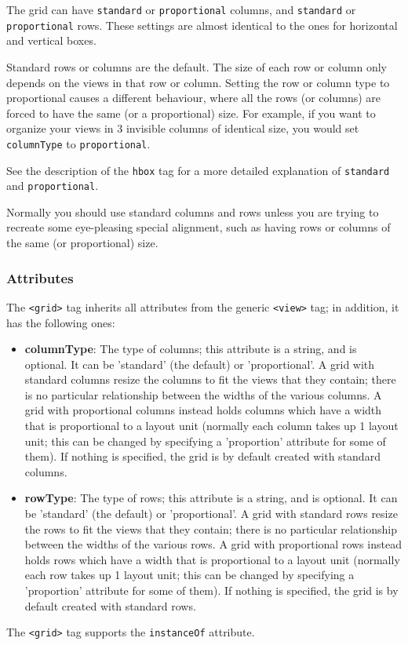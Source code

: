 The grid can have \texttt{standard} or \texttt{proportional} columns,
and \texttt{standard} or \texttt{proportional} rows.  These settings
are almost identical to the ones for horizontal and vertical boxes.

Standard rows or columns are the default.  The size of each row or
column only depends on the views in that row or column.  Setting the
row or column type to proportional causes a different behaviour, where
all the rows (or columns) are forced to have the same (or a
proportional) size.  For example, if you want to organize your views
in 3 invisible columns of identical size, you would set
\texttt{columnType} to \texttt{proportional}.

See the description of the \texttt{hbox} tag for a more detailed
explanation of \texttt{standard} and \texttt{proportional}.

Normally you should use standard columns and rows unless you are
trying to recreate some eye-pleasing special alignment, such as having
rows or columns of the same (or proportional) size.

\subsubsection{Attributes}
The \texttt{<grid>} tag inherits all attributes from the generic
\texttt{<view>} tag; in addition, it has the following ones:
\begin{itemize}
\item {\bf columnType}: The type of columns; this attribute is a
  string, and is optional.  It can be 'standard' (the default) or
  'proportional'.  A grid with standard columns resize the columns to
  fit the views that they contain; there is no particular relationship
  between the widths of the various columns.  A grid with proportional
  columns instead holds columns which have a width that is
  proportional to a layout unit (normally each column takes up 1
  layout unit; this can be changed by specifying a 'proportion'
  attribute for some of them).  If nothing is specified, the grid is
  by default created with standard columns.
\item {\bf rowType}: The type of rows; this attribute is a string, and
  is optional.  It can be 'standard' (the default) or 'proportional'.
  A grid with standard rows resize the rows to fit the views that they
  contain; there is no particular relationship between the widths of
  the various rows.  A grid with proportional rows instead holds rows
  which have a width that is proportional to a layout unit (normally
  each row takes up 1 layout unit; this can be changed by specifying a
  'proportion' attribute for some of them).  If nothing is specified,
  the grid is by default created with standard rows.
\end{itemize}
The \texttt{<grid>} tag supports the \texttt{instanceOf} attribute.


